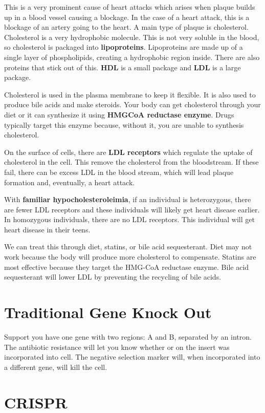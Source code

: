 \documentclass{article}
\begin{document}
This is a very prominent cause of heart attacks which arises when plaque builds
up in a blood vessel causing a blockage. In the case of a heart attack, this is
a blockage of an artery going to the heart. A main type of plaque is
cholesterol. Cholesterol is a very hydrophobic molecule. This is not very
soluble in the blood, so cholesterol is packaged into \textbf{lipoproteins}.
Lipoproteins are made up of a single layer of phospholipids, creating a
hydrophobic region inside. There are also proteins that stick out of this.
\textbf{HDL} is a small package and \textbf{LDL} is a large package.

Cholesterol is used in the plasma membrane to keep it flexible. It is also used
to produce bile acids and make steroids. Your body can get cholesterol through
your diet or it can synthesize it using \textbf{HMGCoA reductase enzyme}. Drugs
typically target this enzyme because, without it, you are unable to synthesis
cholesterol.

On the surface of cells, there are \textbf{LDL receptors} which regulate the
uptake of cholesterol in the cell. This remove the cholesterol from the
bloodstream.  If these fail, there can be excess LDL in the blood stream, which
will lead plaque formation and, eventually, a heart attack.

With \textbf{familiar hypocholesteroleimia}, if an individual is heterozygous,
there are fewer LDL receptors and these individuals will likely get heart
disease earlier. In homozygous individuals, there are no LDL receptors. This
individual will get heart disease in their teens.

We can treat this through diet, statins, or bile acid sequesterant. Diet may not
work because the body will produce more cholesterol to compensate. Statins are
most effective because they target the HMG-CoA reductase enzyme. Bile acid
sequesterant will lower LDL by preventing the recycling of bile acids.

\section{Traditional Gene Knock Out}

Support you have one gene with two regions: A and B, separated by an intron. The
antibiotic resistance will let you know whether or on the insert was
incorporated into cell. The negative selection marker will, when incorporated
into a different gene, will kill the cell.

\section{CRISPR}
\end{document}
